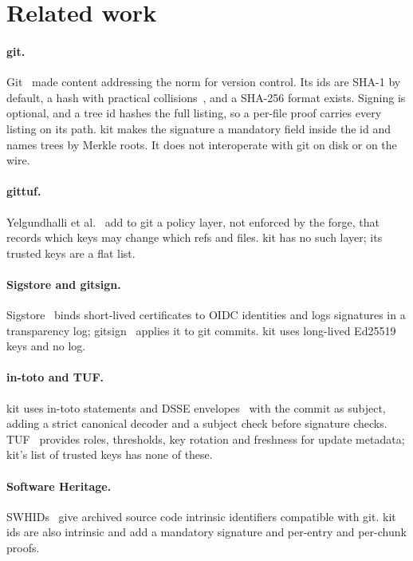 \documentclass[10pt,letterpaper]{article}
\theoremstyle{remark}
\newcommand{\kit}{\textsf{kit}}
\begin{document}
\section{Related work}\label{sec:related}

\paragraph{git.} Git~\cite{git} made content addressing the norm for version
control. Its ids are SHA-1 by default, a hash with practical
collisions~\cite{stevens2017shattered,leurent2020shambles}, and a SHA-256
format exists. Signing is optional, and a tree id hashes the full listing, so a
per-file proof carries every listing on its path. \kit{} makes the signature a
mandatory field inside the id and names trees by Merkle roots. It does not
interoperate with git on disk or on the wire.

\paragraph{gittuf.} Yelgundhalli et al.~\cite{gittuf} add to git a policy layer,
not enforced by the forge, that records which keys may change which refs and
files. \kit{} has no such layer; its trusted keys are a flat list.

\paragraph{Sigstore and gitsign.} Sigstore~\cite{sigstore} binds short-lived
certificates to OIDC identities and logs signatures in a transparency log;
gitsign~\cite{gitsign} applies it to git commits. \kit{} uses long-lived Ed25519
keys and no log.

\paragraph{in-toto and TUF.} \kit{} uses in-toto statements and DSSE
envelopes~\cite{intoto,dsse} with the commit as subject, adding a strict
canonical decoder and a subject check before signature checks. TUF~\cite{tuf}
provides roles, thresholds, key rotation and freshness for update metadata;
\kit{}'s list of trusted keys has none of these.

\paragraph{Software Heritage.} SWHIDs~\cite{swhid} give archived source code
intrinsic identifiers compatible with git. \kit{} ids are also intrinsic and
add a mandatory signature and per-entry and per-chunk proofs.
\end{document}
